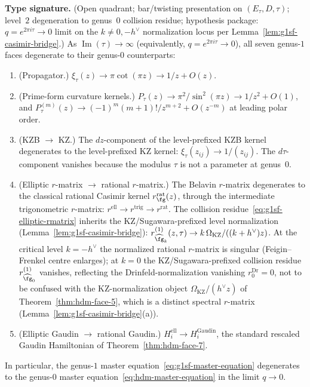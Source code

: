\begin{theorem}
\label{thm:g1sf-degeneration}
\textbf{Type signature.} (Open quadrant; bar/twisting presentation on
$(E_\tau, D, \tau)$; level~$2$ degeneration to genus~$0$ collision
residue; hypothesis package: $q = e^{2\pi i\tau}\to 0$ limit on the
$k\neq 0,-h^\vee$ normalization locus per
Lemma~\ref{lem:g1sf-casimir-bridge}.)
As $\operatorname{Im}(\tau) \to \infty$
\textup{(}equivalently, $q = e^{2\pi i\tau} \to 0$\textup{)}, all
seven genus-$1$ faces degenerate to their genus-$0$ counterparts:
\begin{enumerate}[label=\textup{(\roman*)}]
\item \textup{(}Propagator.\textup{)}
$\xi_\tau(z) \to \pi\cot(\pi z) \to 1/z + O(z)$.

\item \textup{(}Prime-form curvature kernels.\textup{)}
$P_\tau(z) \to \pi^2/\sin^2(\pi z) \to 1/z^2 + O(1)$, and
$P_\tau^{(m)}(z) \to (-1)^m(m+1)!/z^{m+2} + O(z^{-m})$ at leading
polar order.

\item \textup{(}KZB $\to$ KZ.\textup{)}
The $dz$-component of the level-prefixed KZB kernel degenerates to the
level-prefixed KZ kernel: $\xi_\tau(z_{ij}) \to 1/(z_{ij})$. The
$d\tau$-component vanishes because the modulus $\tau$ is not a
parameter at genus~$0$.

\item \textup{(}Elliptic $r$-matrix $\to$ rational $r$-matrix.\textup{)}
The Belavin $r$-matrix degenerates to the classical rational Casimir
kernel $r^{\mathrm{rat}}_\fg(z)$, through the
intermediate trigonometric $r$-matrix:
$r^{\mathrm{ell}} \to r^{\mathrm{trig}} \to r^{\mathrm{rat}}$.
The collision residue~\eqref{eq:g1sf-elliptic-rmatrix} inherits
the KZ/Sugawara-prefixed level normalization
\textup{(}Lemma~\ref{lem:g1sf-casimir-bridge}\textup{)}:
$r^{(1)}_{\widehat{\fg}_k}(z, \tau) \to k\,\Omega_{\mathrm{KZ}}/((k+h^\vee)z)$.
At the critical level $k = -h^\vee$ the normalized rational
$r$-matrix is singular \textup{(}Feigin--Frenkel centre
enlarges\textup{)}; at $k = 0$ the KZ/Sugawara-prefixed collision
residue $r^{(1)}_{\widehat{\fg}_0}$ vanishes, reflecting the
Drinfeld-normalization vanishing $r^{\mathrm{Dr}}_0 = 0$, not to be
confused with the KZ-normalization object
$\Omega_{\mathrm{KZ}}/(h^\vee z)$ of Theorem~\ref{thm:hdm-face-5},
which is a distinct spectral $r$-matrix
\textup{(}Lemma~\ref{lem:g1sf-casimir-bridge}(a)\textup{)}.
\item \textup{(}Elliptic Gaudin $\to$ rational Gaudin.\textup{)}
$H_i^{\mathrm{ell}} \to H_i^{\mathrm{Gaudin}}$, the standard rescaled
Gaudin Hamiltonian of Theorem~\ref{thm:hdm-face-7}.
\end{enumerate}
In particular, the genus-$1$ master
equation~\eqref{eq:g1sf-master-equation} degenerates to the genus-$0$
master equation~\eqref{eq:hdm-master-equation} in the limit
$q \to 0$.
\end{theorem}

